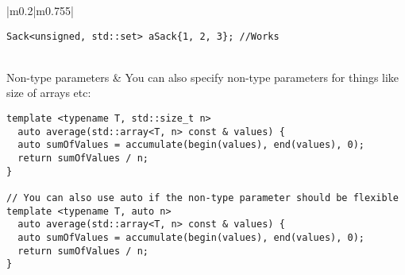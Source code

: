 \documentclass[main.tex,fontsize=8pt,paper=a4,paper=portrait,DIV=calc,]{scrartcl}
\begin{document}
\begin{table}[ht!]
\begin{tabular}{|m{0.2\linewidth}|m{0.755\linewidth}|}
\begin{lstlisting}
Sack<unsigned, std::set> aSack{1, 2, 3}; //Works
\end{lstlisting}\\
\hline
Non-type parameters & 
You can also specify non-type parameters for things like size of arrays etc:\newline
\begin{lstlisting}
template <typename T, std::size_t n>
  auto average(std::array<T, n> const & values) {
  auto sumOfValues = accumulate(begin(values), end(values), 0);
  return sumOfValues / n;
}

// You can also use auto if the non-type parameter should be flexible
template <typename T, auto n>
  auto average(std::array<T, n> const & values) {
  auto sumOfValues = accumulate(begin(values), end(values), 0);
  return sumOfValues / n;
}
\end{lstlisting}\\
\hline
\end{tabular}
\end{table}
\pagebreak
\begin{table}[ht!]
\begin{tabular}{|m{0.2\linewidth}|m{0.755\linewidth}|}
\hline

\hline

\hline

\hline

\hline

\hline

\hline

\hline
\end{tabular}
\end{table}
\end{document}
